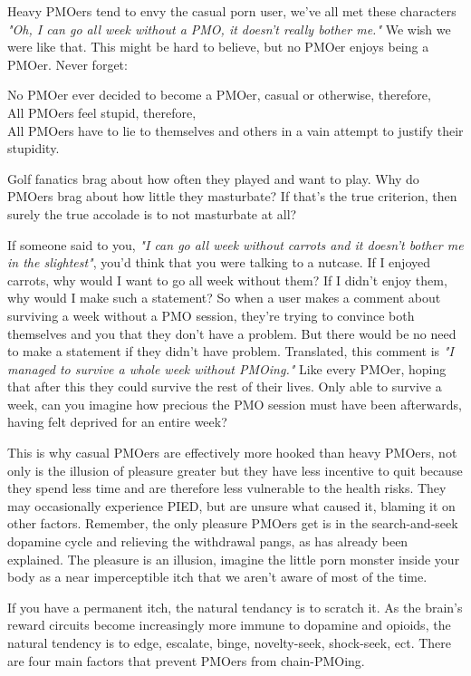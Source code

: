 \documentclass[easypeasy]{subfiles}
\begin{document}
Heavy PMOers tend to envy the casual porn user, we've all met these characters \textit{"Oh, I can go all week without a PMO, it doesn't really bother me."} We wish we were like that. This might be hard to believe, but no PMOer enjoys being a PMOer. Never forget:

  No PMOer ever decided to become a PMOer, casual or otherwise, therefore,\\
  All PMOers feel stupid, therefore,\\
  All PMOers have to lie to themselves and others in a vain attempt to justify their stupidity.

Golf fanatics brag about how often they played and want to play. Why do PMOers brag about how little they masturbate? If that's the true criterion, then surely the true accolade is to not masturbate at all?

If someone said to you, \textit{"I can go all week without carrots and it doesn't bother me in the slightest"}, you'd think that you were talking to a nutcase. If I enjoyed carrots, why would I want to go all week without them? If I didn't enjoy them, why would I make such a statement? So when a user makes a comment about surviving a week without a PMO session, they're trying to convince both themselves and you that they don't have a problem. But there would be no need to make a statement if they didn't have problem. Translated, this comment is \textit{"I managed to survive a whole week without PMOing."} Like every PMOer, hoping that after this they could survive the rest of their lives. Only able to survive a week, can you imagine how precious the PMO session must have been afterwards, having felt deprived for an entire week?

This is why casual PMOers are effectively more hooked than heavy PMOers, not only is the illusion of pleasure greater but they have less incentive to quit because they spend less time and are therefore less vulnerable to the health risks. They may occasionally experience PIED, but are unsure what caused it, blaming it on other factors. Remember, the only pleasure PMOers get is in the search-and-seek dopamine cycle and relieving the withdrawal pangs, as has already been explained. The pleasure is an illusion, imagine the little porn monster inside your body as a near imperceptible itch that we aren't aware of most of the time.

If you have a permanent itch, the natural tendancy is to scratch it. As the brain's reward circuits become increasingly more immune to dopamine and opioids, the natural tendency is to edge, escalate, binge, novelty-seek, shock-seek, ect. There are four main factors that prevent PMOers from chain-PMOing.
\end{document}
